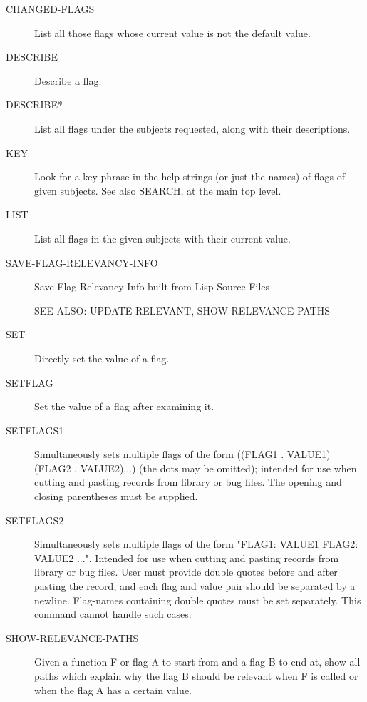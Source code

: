 \begin{description} 
\item[CHANGED-FLAGS]  
List all those flags whose current value is not
the default value.

\item[DESCRIBE]  
Describe a flag.

\item[DESCRIBE*]  
List all flags under the subjects requested, along with their descriptions.

\item[KEY]  
Look for a key phrase in the help strings (or just the names) 
of flags of given subjects. See also SEARCH, at the main top level.

\item[LIST]  
List all flags in the given subjects with their current value.

\item[SAVE-FLAG-RELEVANCY-INFO]  
Save Flag Relevancy Info built from Lisp Source Files

SEE ALSO:  UPDATE-RELEVANT, SHOW-RELEVANCE-PATHS

\item[SET]  
Directly set the value of a flag.

\item[SETFLAG]  
Set the value of a flag after examining it.

\item[SETFLAGS1]  
Simultaneously sets multiple flags of the form ((FLAG1 . VALUE1)
(FLAG2 . VALUE2)...) (the dots may be omitted); intended for use
when cutting and pasting records from library or bug files. The opening
and closing parentheses must be supplied.

\item[SETFLAGS2]  
Simultaneously sets multiple flags of the form "FLAG1: VALUE1
FLAG2: VALUE2 ...". Intended for use when cutting and pasting records 
from library or bug files. User must provide double quotes before and 
after pasting the record, and each flag and value pair should be 
separated by a newline. Flag-names containing double quotes must be 
set separately. This command cannot handle such cases.

\item[SHOW-RELEVANCE-PATHS]  
Given a function F or flag A to start from and a flag B to end at,
show all paths which explain why the flag B should be relevant when F is called
or when the flag A has a certain value.


\end{description}
